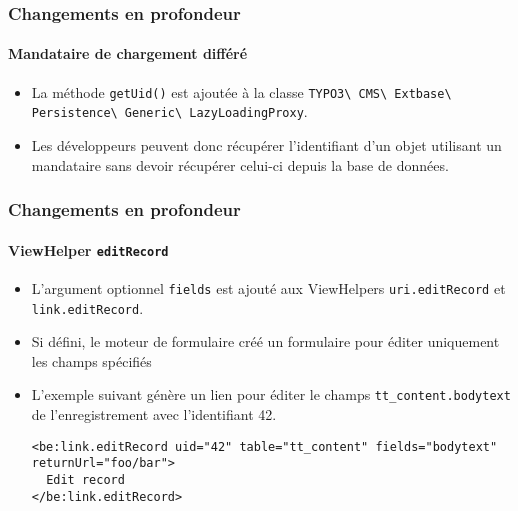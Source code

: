 
\begin{frame}[fragile]
	\frametitle{Changements en profondeur}
	\framesubtitle{Mandataire de chargement différé}

	\lstset{basicstyle=\tiny\ttfamily}

	\begin{itemize}
		\item La méthode \texttt{getUid()} est ajoutée à la classe\newline
			\texttt{TYPO3\textbackslash
				CMS\textbackslash
				Extbase\textbackslash
				Persistence\textbackslash
				Generic\textbackslash
				LazyLoadingProxy}.
		\item Les développeurs peuvent donc récupérer l'identifiant d'un objet utilisant un mandataire
			sans devoir récupérer celui-ci depuis la base de données.

	\end{itemize}

\end{frame}


\begin{frame}[fragile]
	\frametitle{Changements en profondeur}
	\framesubtitle{ViewHelper \texttt{editRecord}}

	\lstset{basicstyle=\tiny\ttfamily}

	\begin{itemize}
		\item L'argument optionnel \texttt{fields} est ajouté aux ViewHelpers
			\texttt{uri.editRecord} et \texttt{link.editRecord}.
		\item Si défini, le moteur de formulaire créé un formulaire pour éditer
			uniquement les champs spécifiés
		\item L'exemple suivant génère un lien pour éditer le champs \texttt{tt\_content.bodytext}
			de l'enregistrement avec l'identifiant 42.
\begin{lstlisting}
<be:link.editRecord uid="42" table="tt_content" fields="bodytext" returnUrl="foo/bar">
  Edit record
</be:link.editRecord>
\end{lstlisting}

	\end{itemize}

\end{frame}

